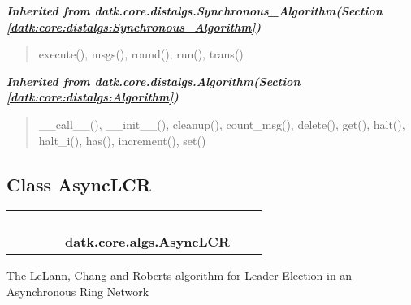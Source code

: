 \large{\textbf{\textit{Inherited from datk.core.distalgs.Synchronous\_Algorithm\textit{(Section \ref{datk:core:distalgs:Synchronous_Algorithm})}}}}

\begin{quote}
execute(), msgs(), round(), run(), trans()
\end{quote}

\large{\textbf{\textit{Inherited from datk.core.distalgs.Algorithm\textit{(Section \ref{datk:core:distalgs:Algorithm})}}}}

\begin{quote}
\_\_call\_\_(), \_\_init\_\_(), cleanup(), count\_msg(), delete(), get(), halt(), halt\_i(), has(), increment(), set()
\end{quote}


\subsection{Class AsyncLCR}

    \label{datk:core:algs:AsyncLCR}
\begin{tabular}{cccccccc}
\multicolumn{2}{r}{\settowidth{\BCL}{datk.core.distalgs.Algorithm}\multirow{2}{\BCL}{datk.core.distalgs.Algorithm}}
&&
&&
  \\\cline{3-3}
  &&\multicolumn{1}{c|}{}
&&
&&
  \\
\multicolumn{4}{r}{\settowidth{\BCL}{datk.core.distalgs.Asynchronous\_Algorithm}\multirow{2}{\BCL}{datk.core.distalgs.Asynchronous\_Algorithm}}
&&
  \\\cline{5-5}
  &&&&\multicolumn{1}{c|}{}
&&
  \\
&&&&\multicolumn{2}{l}{\textbf{datk.core.algs.AsyncLCR}}
\end{tabular}

The LeLann, Chang and Roberts algorithm for Leader Election in an 
Asynchronous Ring Network

